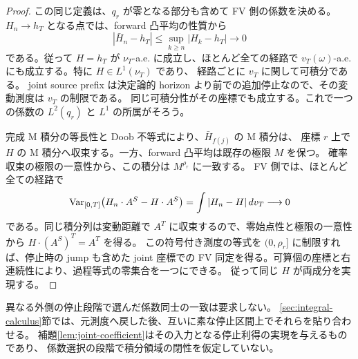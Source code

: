 \begin{proof}
この同じ定義は、$q_r$ が零となる部分も含めて FV 側の係数を決める。
$H_n\to h_T$ となる点では、forward 凸平均の性質から
\[
 |\bar H_n-h_T|\leq\sup_{k\geq n}|H_k-h_T|\longrightarrow0
\]
である。従って $H=h_T$ が $\nu_T$-a.e. に成立し、ほとんど全ての経路で
$v_T(\omega)$-a.e. にも成立する。特に $H\in L^1(\nu_T)$ であり、
経路ごとに $v_T$ に関して可積分である。
joint source prefix は決定論的 horizon より前での追加停止なので、その変動測度は $v_T$ の制限である。
同じ可積分性がその座標でも成立する。これで一つの係数の $L^2(q_r)$ と $L^1$ の所属がそろう。

完成 M 積分の等長性と Doob 不等式により、$\bar H_{f(j)}$ の M 積分は、
座標 $r$ 上で $H$ の M 積分へ収束する。一方、forward 凸平均は既存の極限 $M$ を保つ。
確率収束の極限の一意性から、この積分は $M^{\rho_r}$ に一致する。
FV 側では、ほとんど全ての経路で
\[
 \operatorname{Var}_{[0,T]}\bigl(H_n\cdot A^S-H\cdot A^S\bigr)
 =\int|H_n-H|\,dv_T\longrightarrow0
\]
である。同じ積分列は変動距離で $A^T$ に収束するので、零始点性と極限の一意性から
$H\cdot(A^S)^T=A^T$ を得る。
この符号付き測度の等式を $(0,\rho_r]$ に制限すれば、停止時の jump も含めた
joint 座標での FV 同定を得る。可算個の座標と右連続性により、過程等式の零集合を一つにできる。
従って同じ $H$ が両成分を実現する。
\end{proof}
異なる外側の停止段階で選んだ係数同士の一致は要求しない。
\ref{sec:integral-calculus}節では、元測度へ戻した後、互いに素な停止区間上でそれらを貼り合わせる。
補題\ref{lem:joint-coefficient}はその入力となる停止利得の実現を与えるものであり、
係数選択の段階で積分領域の閉性を仮定していない。
